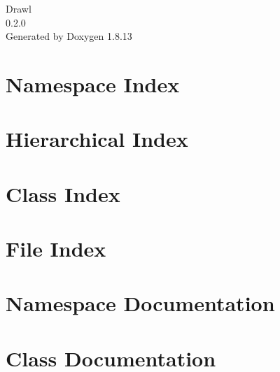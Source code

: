 \documentclass[twoside]{book}
\newcommand{\+}{\discretionary{\mbox{\scriptsize$\hookleftarrow$}}{}{}}
\newcommand{\clearemptydoublepage}{%
  \newpage{\pagestyle{empty}\cleardoublepage}%
}
\begin{document}
\hypersetup{pageanchor=false,
             bookmarksnumbered=true,
             pdfencoding=unicode
            }
\begin{titlepage}
\vspace*{7cm}
\begin{center}%
{\Large Drawl \\[1ex]\large 0.\+2.\+0 }\\
\vspace*{1cm}
{\large Generated by Doxygen 1.8.13}\\
\end{center}
\end{titlepage}
\clearemptydoublepage
{}
\tableofcontents
\clearemptydoublepage
{}
\hypersetup{pageanchor=true}

\chapter{Namespace Index}

\chapter{Hierarchical Index}

\chapter{Class Index}

\chapter{File Index}

\chapter{Namespace Documentation}




\chapter{Class Documentation}













\end{document}
